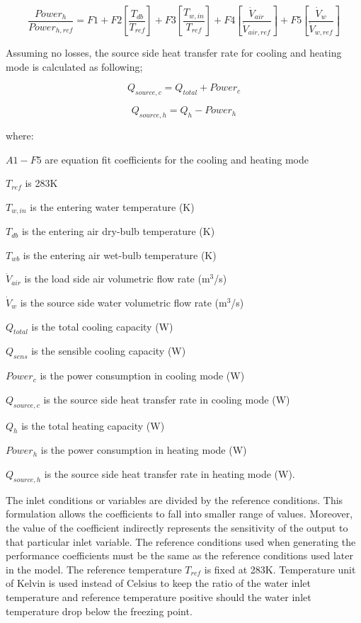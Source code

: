 \begin{equation}
\frac{{Powe{r_h}}}{{Powe{r_{h,ref}}}} = F1 + F2\left[ {\frac{{{T_{db}}}}{{{T_{ref}}}}} \right] + F3\left[ {\frac{{{T_{w,in}}}}{{{T_{ref}}}}} \right] + F4\left[ {\frac{{{{\dot V}_{air}}}}{{{{\dot V}_{air,ref}}}}} \right] + F5\left[ {\frac{{{{\dot V}_w}}}{{{{\dot V}_{w,ref}}}}} \right]
\end{equation}

Assuming no losses, the source side heat transfer rate for cooling and heating mode is calculated as following;

\begin{equation}
{Q_{source,c}} = {Q_{total}} + Powe{r_c}
\end{equation}

\begin{equation}
{Q_{source,h}} = {Q_h} - Powe{r_h}
\end{equation}

where:

\(A1 - F5\) are equation fit coefficients for the cooling and heating mode

\({{T_{ref}}}\) is 283K

\({{T_{w,in}}}\) is the entering water temperature (K)

\({{T_{db}}}\) is the entering air dry-bulb temperature (K)

\({{T_{wb}}}\) is the entering air wet-bulb temperature (K)

\({{{\dot V}_{air}}}\) is the load side air volumetric flow rate (m\(^{3}\)/s)

\({{{\dot V}_{w}}}\) is the source side water volumetric flow rate (m\(^{3}\)/s)

\({{Q_{total}}}\) is the total cooling capacity (W)

\({{Q_{sens}}}\) is the sensible cooling capacity (W)

\({Powe{r_c}}\) is the power consumption in cooling mode (W)

\({{Q_{source,c}}}\) is the source side heat transfer rate in cooling mode (W)

\({{Q_{h}}}\) is the total heating capacity (W)

\({Powe{r_h}}\) is the power consumption in heating mode (W)

\({{Q_{source,h}}}\) is the source side heat transfer rate  in heating mode (W).

The inlet conditions or variables are divided by the reference conditions. This formulation allows the coefficients to fall into smaller range of values. Moreover, the value of the coefficient indirectly represents the sensitivity of the output to that particular inlet variable. The reference conditions used when generating the performance coefficients must be the same as the reference conditions used later in the model. The reference temperature \({{T_{ref}}}\) is fixed at 283K. Temperature unit of Kelvin is used instead of Celsius to keep the ratio of the water inlet temperature and reference temperature positive should the water inlet temperature drop below the freezing point.

